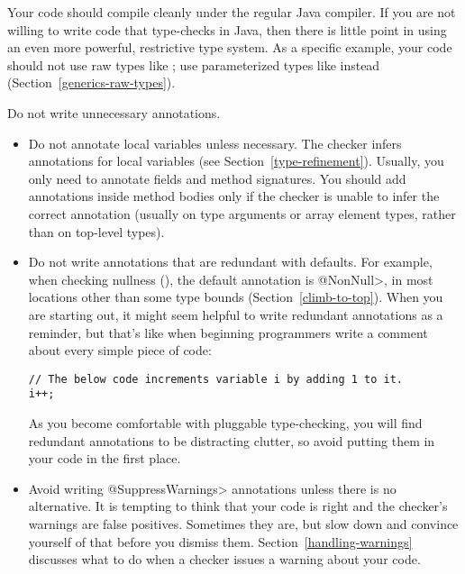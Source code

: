 Your code should compile cleanly under the regular Java compiler.  If you
are not willing to write code that type-checks in Java, then there is
little point in using an even more powerful, restrictive type system.  As a
specific example, your code should not use raw types like ; use
parameterized types like  instead
(Section~\ref{generics-raw-types}).

Do not write unnecessary annotations.
\begin{itemize}
\item
  Do not annotate local variables unless necessary.  The checker infers
  annotations for local variables (see Section~\ref{type-refinement}).
  Usually, you only need to annotate fields and method signatures.  You
  should add annotations inside method bodies only if the checker is unable
  to infer the correct annotation (usually on type arguments or array
  element types, rather than
  on top-level types).

\item
  Do not write annotations that are redundant with defaults.  For example,
  when checking nullness (), the default
  annotation is \<@NonNull>, in most locations other than some type bounds
  (Section~\ref{climb-to-top}).  When you are starting out, it might seem
  helpful to write redundant annotations as a reminder, but that's like
  when beginning programmers write a comment about every simple piece of
  code:

\begin{Verbatim}
// The below code increments variable i by adding 1 to it.
i++;
\end{Verbatim}

  As you become comfortable with pluggable type-checking, you will find
  redundant annotations to be distracting clutter, so avoid putting them in
  your code in the first place.

\item
  Avoid writing \<@SuppressWarnings> annotations unless there is no
  alternative.  It is tempting to think that your code is right and the
  checker's warnings are false positives.  Sometimes they are, but slow
  down and convince yourself of that before you dismiss them.
  Section~\ref{handling-warnings} discusses what to do when a checker
  issues a warning about your code.

\end{itemize}


